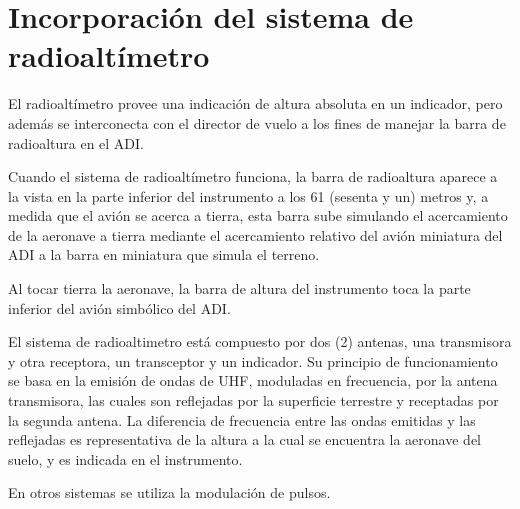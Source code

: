 \documentclass[a4paper,12pt,twoside]{article}
\begin{document}
\section{Incorporaci\'on del sistema de radioalt\'imetro}
\label{sec:incorporacion.sistema.radio.altimetro}

El radioalt\'imetro provee una indicaci\'on de altura absoluta en un indicador,
pero adem\'as se interconecta con el director de vuelo a los fines
de manejar la barra de radioaltura en el ADI.

Cuando el sistema de radioalt\'imetro funciona, la barra de radioaltura aparece a la vista
en la parte inferior del instrumento a los 61 (sesenta y un) metros y, a medida que
el avi\'on se acerca a tierra, esta barra sube simulando el acercamiento de la aeronave
a tierra mediante el acercamiento relativo del avi\'on miniatura del ADI
a la barra en miniatura que simula el terreno.

Al tocar tierra la aeronave, la barra de altura del instrumento toca la parte
inferior del avi\'on simb\'olico del ADI.

El sistema de radioaltimetro est\'a compuesto por dos (2) antenas, una transmisora
y otra receptora, un transceptor y un indicador.
Su principio de funcionamiento se basa en la emisi\'on de ondas de UHF, moduladas
en frecuencia, por la antena transmisora, las cuales son reflejadas por la superficie
terrestre y receptadas por la segunda antena. La diferencia de frecuencia entre
las ondas emitidas y las reflejadas es representativa de la altura a la cual se
encuentra la aeronave del suelo, y es indicada en el instrumento.

En otros sistemas se utiliza la modulaci\'on de pulsos.
\end{document}
